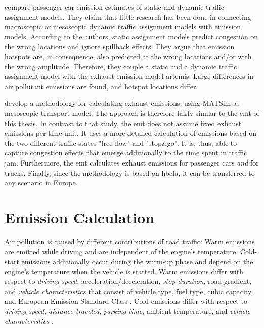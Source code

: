 {\citet{WismansEtAl_TRB_2013} compare passenger car emission 
estimates of static and dynamic traffic assignment models. They claim that 
little research has been done in connecting macroscopic or mesoscopic dynamic 
traffic assignment models with emission models.
%
According to the authors, static assignment models predict congestion on the 
wrong locations and ignore spillback effects. They argue that emission 
hotspots are, in consequence, also predicted at the wrong locations and/or 
with the wrong amplitude.
%
Therefore, they couple a static and a dynamic traffic assignment model with 
the exhaust emission model \acrshort{artemis}. Large differences in air 
pollutant emissions are found, and hotspot locations differ.

\citet{HatzopoulouMiller_TransResD_2010} develop a methodology for 
calculating exhaust emissions, using MATSim as mesoscopic transport 
model. The approach is therefore fairly similar to the \gls{emt} of this thesis.
%
In contrast to that study, the \gls{emt} does not assume fixed exhaust 
emissions per time unit. It uses a more detailed calculation of emissions based 
on the two different traffic states "free flow" and "stop\&go". It is, thus, 
able to capture congestion effects that emerge additionally to the time spent 
in traffic jam. 
Furthermore, the \gls{emt} calculates exhaust emissions for passenger cars 
\emph{and} for trucks. Finally, since the methodology is based on \gls{hbefa}, 
it can be transferred to any scenario in Europe.

\section{Emission Calculation}
\label{ch:emissions:overview}
%
Air pollution is caused by different contributions of road traffic:
%
Warm emissions are emitted while driving and are independent of the engine's temperature.
%
Cold-start emissions additionally occur during the warm-up phase and depend on the engine's temperature when the vehicle is started.
%
Warm emissions differ with respect to \emph{driving speed}, acceleration/deceleration, \emph{stop duration}, road gradient, and \emph{vehicle characteristics} that consist of vehicle type, fuel type, cubic capacity, and European Emission Standard Class \citep{AndreRapone_Atmos_2009}.
%
Cold emissions differ with respect to \emph{driving speed}, \emph{distance traveled}, \emph{parking time}, ambient temperature, and \emph{vehicle characteristics} \citep{WeilenmannEtAl_Atmos_2009}.

}
